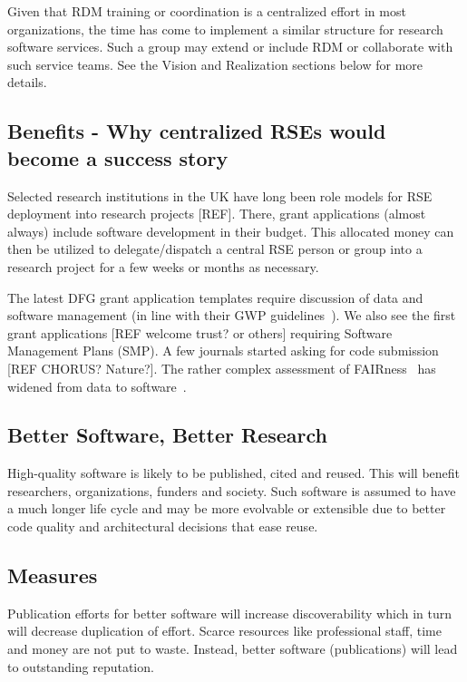 \documentclass[a4paper]{article}
\begin{document}
Given that RDM training or coordination is a centralized effort in most organizations, the time has come to implement a similar structure for research software services.
Such a group may extend or include RDM or collaborate with such service teams.
See the Vision and Realization sections below for more details.

\subsection{Benefits - Why centralized RSEs would become a success story}


Selected research institutions in the UK have long been role models for RSE deployment into research projects [REF].
There, grant applications (almost always) include software development in their budget.
This allocated money can then be utilized to delegate/dispatch a central RSE person or group into a research project for a few weeks or months as necessary.


The latest DFG grant application templates require discussion of data and software management (in line with their GWP guidelines~\autocite{dfg_gsp}).
We also see the first grant applications [REF welcome trust? or others] requiring Software Management Plans (SMP).
A few journals started asking for code submission [REF CHORUS? Nature?].
The rather complex assessment of FAIRness~\autocite{Wilkinson2023,FAIRmaturity} has widened from data to software~\autocite{Lamprecht2020}.



\subsection{Better Software, Better Research}

High-quality software is likely to be published, cited and reused.
This will benefit researchers, organizations, funders and society.
Such software is assumed to have a much longer life cycle and may be more evolvable or extensible due to better code quality and architectural decisions that ease reuse.

\subsection{Measures}

Publication efforts for better software will increase discoverability which in turn will decrease duplication of effort.
Scarce resources like professional staff, time and money are not put to waste. Instead, better software (publications) will lead to outstanding reputation.
\end{document}
